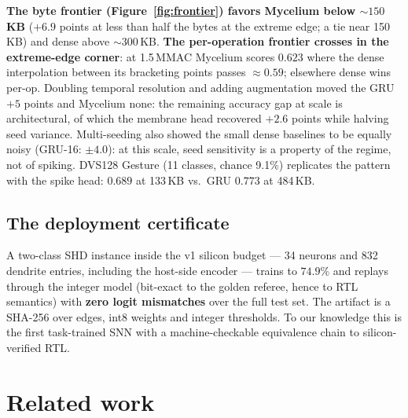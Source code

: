\documentclass[11pt]{article}
\begin{document}
\textbf{The byte frontier (Figure~\ref{fig:frontier}) favors Mycelium below ${\sim}150$\,KB} ($+6.9$
points at less than half the bytes at the extreme edge; a tie near 150\,KB)
and dense above ${\sim}300$\,KB. \textbf{The per-operation frontier crosses
in the extreme-edge corner}: at 1.5\,MMAC Mycelium scores $0.623$ where the
dense interpolation between its bracketing points passes ${\approx}0.59$;
elsewhere dense wins per-op. Doubling temporal resolution and adding
augmentation moved the GRU $+5$ points and Mycelium none: the remaining
accuracy gap at scale is architectural, of which the membrane head recovered
$+2.6$ points while halving seed variance. Multi-seeding also showed the
small dense baselines to be equally noisy (GRU-16: $\pm 4.0$): at this scale,
seed sensitivity is a property of the regime, not of spiking. DVS128 Gesture
\cite{amir2017dvs} (11 classes, chance 9.1\%) replicates the pattern with the
spike head: $0.689$ at 133\,KB vs.\ GRU $0.773$ at 484\,KB.

\subsection{The deployment certificate}

A two-class SHD instance inside the v1 silicon budget --- 34 neurons and 832
dendrite entries, including the host-side encoder --- trains to $74.9\%$ and
replays through the integer model (bit-exact to the golden referee, hence to
RTL semantics) with \textbf{zero logit mismatches} over the full test set.
The artifact is a SHA-256 over edges, int8 weights and integer thresholds.
To our knowledge this is the first task-trained SNN with a machine-checkable
equivalence chain to silicon-verified RTL.

\section{Related work}
\end{document}
